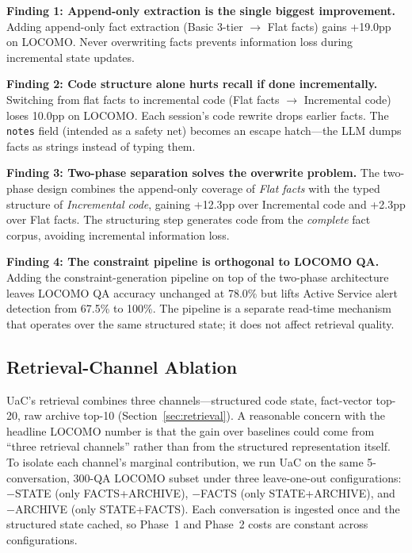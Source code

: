 \textbf{Finding 1: Append-only extraction is the single biggest improvement.} Adding append-only fact extraction (Basic 3-tier $\to$ Flat facts) gains +19.0pp on LOCOMO. Never overwriting facts prevents information loss during incremental state updates.

\textbf{Finding 2: Code structure alone hurts recall if done incrementally.} Switching from flat facts to incremental code (Flat facts $\to$ Incremental code) loses 10.0pp on LOCOMO. Each session's code rewrite drops earlier facts. The \texttt{notes} field (intended as a safety net) becomes an escape hatch---the LLM dumps facts as strings instead of typing them.

\textbf{Finding 3: Two-phase separation solves the overwrite problem.} The two-phase design combines the append-only coverage of \emph{Flat facts} with the typed structure of \emph{Incremental code}, gaining +12.3pp over Incremental code and +2.3pp over Flat facts. The structuring step generates code from the \emph{complete} fact corpus, avoiding incremental information loss.

\textbf{Finding 4: The constraint pipeline is orthogonal to LOCOMO QA.} Adding the constraint-generation pipeline on top of the two-phase architecture leaves LOCOMO QA accuracy unchanged at 78.0\% but lifts Active Service alert detection from 67.5\% to 100\%. The pipeline is a separate read-time mechanism that operates over the same structured state; it does not affect retrieval quality.

\subsection{Retrieval-Channel Ablation}
\label{sec:channel-ablation}

UaC's retrieval combines three channels---structured code state, fact-vector top-20, raw archive top-10 (Section~\ref{sec:retrieval}). A reasonable concern with the headline LOCOMO number is that the gain over baselines could come from ``three retrieval channels'' rather than from the structured representation itself. To isolate each channel's marginal contribution, we run UaC on the same 5-conversation, 300-QA LOCOMO subset under three leave-one-out configurations: $-$STATE (only FACTS+ARCHIVE), $-$FACTS (only STATE+ARCHIVE), and $-$ARCHIVE (only STATE+FACTS). Each conversation is ingested once and the structured state cached, so Phase~1 and Phase~2 costs are constant across configurations.

